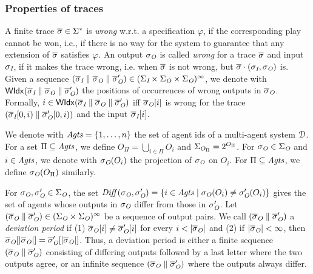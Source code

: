 \subsubsection*{Properties of traces}
A finite trace $\overline\sigma
\in \Sigma^*$ is \emph{wrong} w.r.t. a specification $\varphi$, if the corresponding play cannot be won,
i.e., if there is no way for the system to guarantee that any
extension of $\overline\sigma$ satisfies $\varphi$.
An output $\sigma_{\textit{O}}$
is called \emph{wrong} for a trace $\overline\sigma$ and input $\sigma_{\textit{I}}$, if it makes the trace wrong, i.e. when $\overline\sigma$ is not wrong, but $\overline\sigma \cdot (\sigma_{\textit{I}},\sigma_{\textit{O}})$ is. Given a sequence $(\overline\sigma_{\textit{I}}\parallel\overline\sigma_{\textit{O}}\parallel\overline\sigma_{\textit{O}}') \in (\Sigma_{\textit{I}}\times\Sigma_{\textit{O}}\times\Sigma_{\textit{O}})^\infty$, we denote with $\mathsf{WIdx}(\overline\sigma_{\textit{I}}\parallel\overline\sigma_{\textit{O}}\parallel\overline\sigma_{\textit{O}}')$ the positions of occurrences of wrong outputs in $\overline\sigma_{\textit{O}}$. Formally, $i \in \mathsf{WIdx}(\overline\sigma_{\textit{I}}\parallel\overline\sigma_{\textit{O}}\parallel\overline\sigma_{\textit{O}}')$ iff  $\overline\sigma_{\textit{O}}[i]$ is wrong for the trace
$(\overline\sigma_{\textit{I}}[0,i)\parallel\overline\sigma_{\textit{O}}'[0,i))$ and the input $\overline\sigma_{\textit{I}}[i]$.

%
We denote with $\mathit{Agts} = \{1,\ldots,n\}$ the set of agent ids of a multi-agent system $\mathcal{D}$.
%
For a set $\Pi \subseteq \mathit{Agts}$, we define $O_{\Pi} = \bigcup_{i \in \Pi} O_i$ and $\Sigma_{O_{\Pi}} = 2^{O_{\Pi}}$. For $\sigma_{\textit{O}} \in \Sigma_{\textit{O}}$ and $i \in \mathit{Agts}$, we denote with $\sigma_{\textit{O}}(O_i)$ the projection of $\sigma_{\textit{O}}$ on $O_i$. For $\Pi \subseteq \mathit{Agts}$, we define $\sigma_{\textit{O}}(O_{\Pi})$ similarly. 

For  $\sigma_{\textit{O}},  \sigma_{\textit{O}}' \in \Sigma_{\textit{O}}$, the set $\mathit{Diff}(\sigma_{\textit{O}},\sigma_{\textit{O}}') = \{i \in \mathit{Agts} \mid \sigma_{\textit{O}}(O_i) \neq \sigma_{\textit{O}}'(O_i)\}$ gives the set of agents whose outputs in $\sigma_{\textit{O}}$ differ from those in $\sigma_{\textit{O}}'$.
Let $(\overline\sigma_{\textit{O}} \parallel \overline\sigma_{\textit{O}}')\in (\Sigma_{\textit{O}}\times\Sigma_{\textit{O}})^\infty$ be a sequence of output pairs.
We call $(\overline\sigma_{\textit{O}} \parallel\overline\sigma_{\textit{O}}')$ a \emph{deviation period} if (1) $\overline\sigma_{\textit{O}}[i] \neq \overline\sigma_{\textit{O}}'[i ]$ for every $i < |\overline\sigma_{\textit{O}}|$  and (2) if $|\overline\sigma_{\textit{O}}| < \infty$, then $\overline\sigma_{\textit{O}}[|\overline\sigma_{\textit{O}}|] = \overline\sigma_{\textit{O}}'[|\overline\sigma_{\textit{O}}|]$.
Thus, a deviation period is either a finite sequence $(\overline\sigma_{\textit{O}}\parallel\overline\sigma_{\textit{O}}')$  consisting of differing outputs followed by a last letter where the two outputs agree, or an infinite sequence $(\overline\sigma_{\textit{O}}\parallel\overline\sigma_{\textit{O}}')$ where the outputs always differ. 



